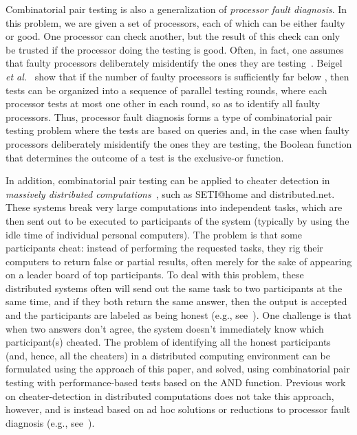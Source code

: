 \documentclass[11pt]{llncs}
\begin{document}
Combinatorial pair testing is also a generalization of
\emph{processor fault diagnosis}. In this problem,
we are given a set of  processors, each of which can be 
either faulty or good. One processor can check another, but the
result of this check can only be trusted if the
processor doing the testing is good.
Often, in fact, one assumes that faulty processors deliberately misidentify
the ones they are testing~\cite{Blecher1983107,Pelc:1998}.
Beigel {\it et al.}~\cite{bhk-95,Beigel:1989,Beigel:1993} 
show that if the number of faulty
processors is sufficiently far below , then
 tests can be organized into
a sequence of  parallel testing rounds, where each processor tests at most one
other in each round, so as to identify all faulty processors.
Thus, processor fault diagnosis forms a type of
combinatorial pair testing problem where the tests are
based on queries and, in the case when faulty processors deliberately
misidentify the ones they are testing, the Boolean function that determines the outcome of a test is the exclusive-or function.

In addition, combinatorial pair testing can be applied to 
cheater detection in 
\emph{massively distributed computations}~\cite{Goodrich2008199}, such as 
SETI@home and distributed.net.
These systems break very large computations into 
independent tasks,
which are then sent out to be executed to participants of the system (typically by using the idle time of individual personal computers).
The problem is that some participants cheat: instead of performing the
requested tasks, they rig their computers to 
return false or partial results, often merely for the sake of appearing on a
leader board of top participants.
To deal with this problem, these distributed systems often will send out the
same task to two participants at the same time, and if they both return the
same answer, then the output is accepted and the participants are labeled as
being honest (e.g., see~\cite{dg-acns-05}).
One challenge is that when two answers don't agree, the system doesn't immediately know
which participant(s) cheated.
The problem of identifying all the honest participants (and, hence, all the cheaters)
in a distributed computing environment can be formulated using the approach of this paper, and solved, using combinatorial
pair testing with performance-based tests based on the AND function.
Previous work on cheater-detection in distributed computations does not take
this approach, however, and is instead based on ad hoc 
solutions or reductions to processor fault diagnosis
(e.g., see~\cite{dg-acns-05,Du:2004,Goodrich2008199}).
\end{document}

